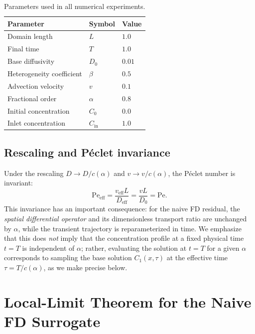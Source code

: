 \documentclass[11pt]{article}
\begin{document}
\begin{table}[h]
\centering
\caption{Parameters used in all numerical experiments.}
\label{tab:params}
\begin{tabular}{lll}
\toprule
Parameter & Symbol & Value \\
\midrule
Domain length & \(L\) & \(1.0\) \\
Final time & \(T\) & \(1.0\) \\
Base diffusivity & \(D_0\) & \(0.01\) \\
Heterogeneity coefficient & \(\beta\) & \(0.5\) \\
Advection velocity & \(v\) & \(0.1\) \\
Fractional order & \(\alpha\) & \(0.8\) \\
Initial concentration & \(C_0\) & \(0.0\) \\
Inlet concentration & \(C_{\mathrm{in}}\) & \(1.0\) \\
\bottomrule
\end{tabular}
\end{table}

\subsection{Rescaling and P\'eclet invariance}
\label{sec:peclet}

Under the rescaling \(D \to D/c(\alpha)\) and \(v \to v/c(\alpha)\), the P\'eclet number is invariant:
\begin{equation}
\mathrm{Pe}_{\mathrm{eff}} = \frac{v_{\mathrm{eff}} L}{D_{\mathrm{eff}}} = \frac{vL}{D_0} = \mathrm{Pe}.
\end{equation}
This invariance has an important consequence: for the naive FD residual, the \emph{spatial differential operator} and its dimensionless transport ratio are unchanged by \(\alpha\), while the transient trajectory is reparameterized in time. We emphasize that this does \emph{not} imply that the concentration profile at a fixed physical time \(t=T\) is independent of \(\alpha\); rather, evaluating the solution at \(t=T\) for a given \(\alpha\) corresponds to sampling the base solution \(C_1(x,\tau)\) at the effective time \(\tau = T/c(\alpha)\), as we make precise below.

\section{Local-Limit Theorem for the Naive FD Surrogate}
\label{sec:local_limit}
\end{document}
